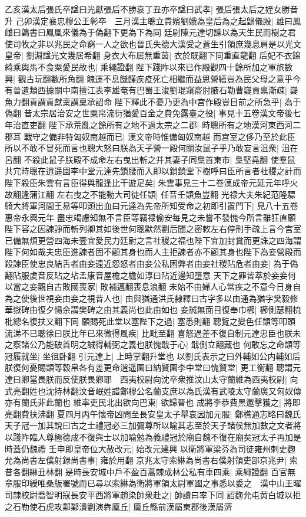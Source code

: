 乙亥漢太后張氏卒諡曰光獻張后不勝哀丁丑亦卒諡曰武孝|{
	張后張太后之姪女勝音升}
己卯漢定襄忠穆公王彰卒　三月漢主聰立貴嬪劉娥為皇后為之起䳨儀殿|{
	雄曰鳳雌曰䳨書曰鳳凰來儀為于偽翻下更為下為同}
廷尉陳元達切諫以為天生民而樹之君使司牧之非以兆民之命窮一人之欲也晉氏失德大漢受之蒼生引領庶幾息肩是以光文皇帝|{
	劉淵諡光文幾居希翻}
身衣大布居無重茵|{
	衣於既翻下同重直龍翻}
后妃不衣錦綺乘輿馬不食粟愛民故也|{
	乘繩證翻}
陛下踐阼以來已作殿觀四十餘所加之軍旅數興|{
	觀古玩翻數所角翻}
餽運不息饑饉疾疫死亡相繼而益思營繕豈為民父母之意乎今有晉遺類西據關中南擅江表李雄奄有巴蜀王浚劉琨窺窬肘腋石勒曹嶷貢禀漸疎|{
	嶷魚力翻貢謂貢獻稟謂稟承詔命}
陛下釋此不憂乃更為中宫作殿豈目前之所急乎|{
	為于偽翻}
昔太宗居治安之世粟帛流衍猶愛百金之費免露臺之役|{
	事見十五卷漢文帝後七年治直吏翻}
陛下承荒亂之餘所有之地不過太宗之二郡|{
	時聰所有之地漢河東西河二郡耳}
戰守之備非特匈奴南越而已|{
	漢文帝時惟備匈奴南越}
而宫室之侈乃至於此臣所以不敢不冒死而言也聰大怒曰朕為天子營一殿何關汝鼠子乎乃敢妄言沮衆|{
	沮在呂翻}
不殺此鼠子朕殿不成命左右曳出斬之并其妻子同梟首東市|{
	梟堅堯翻}
使羣鼠共宂時聰在逍遥園李中堂元達先鎖腰而入即以鎖鎖堂下樹呼曰臣所言者社稷之計而陛下殺臣朱雲有言臣得與龍逢比干遊足矣|{
	朱雲事見三十二卷漢成帝元延元年呼火故翻逢蒲江翻}
左右曳之不能動大司徒任顗|{
	任音壬顗魚豈翻}
光禄大夫朱紀范隆驃騎大將軍河間王易等叩頭出血曰元達為先帝所知受命之初即引置門下|{
	見八十五卷惠帝永興元年}
盡忠竭慮知無不言臣等竊禄偷安每見之未嘗不發愧今所言雖狂直願陛下容之因諫諍而斬列卿其如後世何聰默然劉后聞之密敕左右停刑手疏上言今宫室已備無煩更營四海未壹宜愛民力廷尉之言社稷之福也陛下宜加封賞而更誅之四海謂陛下何如哉夫忠臣進諫者固不顧其身也而人主拒諫者亦不顧其身也陛下為妾營殿而殺諫臣使忠良結舌者由妾遠近怨怒者由妾公私困弊者由妾社稷阽危者由妾|{
	為于偽翻阽服䖍音反玷之坫孟康音屋檐之檐如淳曰阽近邊知墮意}
天下之罪皆萃於妾妾何以當之妾觀自古敗國喪家|{
	敗補邁翻喪息浪翻}
未始不由婦人心常疾之不意今日身自為之使後世視妾由妾之視昔人也|{
	由與猶通洪氏隸釋曰古字多以由通為猶字樊毅修華嶽碑由復夕愓余謂樊碑之由其義尚也此由如也}
妾誠無面目復奉巾櫛|{
	櫛側瑟翻梳枇總名復扶又翻下同}
願賜死此堂以塞陛下之過|{
	塞悉則翻}
聰覽之變色任顗等叩頭流涕不已聰徐曰朕比年已來微得風疾|{
	比毗至翻}
喜怒過差不復自制元達忠臣也朕未之察諸公乃能破首明之誠得輔弼之義也朕愧戢于心|{
	戢側立翻藏也}
何敢忘之命顗等冠履就坐|{
	坐徂卧翻}
引元達上|{
	上時掌翻升堂也}
以劉氏表示之曰外輔如公内輔如后朕復何憂賜顗等穀帛各有差更命逍遥園曰納賢園李中堂曰愧賢堂|{
	更工衡翻}
聰謂元達曰卿當畏朕而反使朕畏卿耶　西夷校尉向沈卒衆推汶山太守蘭維為西夷校尉|{
	向式亮翻姓也沈持林翻汶音岷姓譜鄭穆公名蘭支庶以為氏漢有武陵太守蘭廣又匈奴傳亦有蘭氏非此蘭也}
維率吏民北出欲向巴東|{
	欲歸晉也}
成將李恭費黑邀擊獲之|{
	將即亮翻費扶沸翻}
夏四月丙午懷帝凶問至長安皇太子舉哀因加元服|{
	鄭樵通志略曰魏氏天子冠一加其說曰古之士禮冠必三加彌尊所以喻其志至於天子諸侯無加數之文者將以踐阼臨人尊極德成不復與士以加喻勉為義禮冠於廟自魏不復在廟矣冠太子再加是時蓋仍魏禮}
壬申即皇帝位大赦改元|{
	始改元建興}
以衛將軍梁芬為司徒雍州刺史麴允為尚書左僕射録尚書事|{
	雍於用翻}
京兆太守索綝為尚書右僕射領吏部京兆尹|{
	索昔各翻綝丑林翻}
是時長安城中戶不盈百蒿棘成林公私有車四乘|{
	乘繩證翻}
百官無章服印綬唯桑版署號而已尋以索綝為衛將軍領太尉軍國之事悉以委之　漢中山王曜司隸校尉喬智明寇長安平西將軍趙染帥衆赴之|{
	帥讀曰率下同}
詔麴允屯黄白城以拒之石勒使石虎攻鄴鄴潰劉演犇廩丘|{
	廩丘縣前漢屬東郡後漢屬濟}


